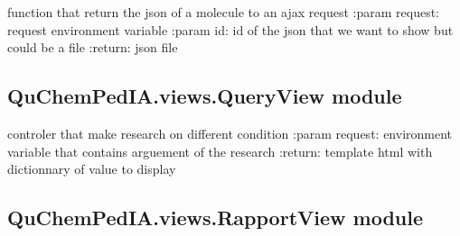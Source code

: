 \documentclass[letterpaper,10pt,english]{sphinxmanual}
\begin{document}
\begin{fulllineitems}
\label{\detokenize{QuChemPedIA.views:QuChemPedIA.views.DetailsView.details_json}}
function that return the json of a molecule to an ajax request
:param request: request environment variable
:param id: id of the json that we want to show but could be a file
:return: json file

\end{fulllineitems}



\subsection{QuChemPedIA.views.QueryView module}
\label{\detokenize{QuChemPedIA.views:module-QuChemPedIA.views.QueryView}}\label{\detokenize{QuChemPedIA.views:quchempedia-views-queryview-module}}

\begin{fulllineitems}
\label{\detokenize{QuChemPedIA.views:QuChemPedIA.views.QueryView.build_url}}
\end{fulllineitems}


\begin{fulllineitems}
\label{\detokenize{QuChemPedIA.views:QuChemPedIA.views.QueryView.query}}
controler that make research on different condition
:param request: environment variable that contains arguement of the research
:return: template html with dictionnary of value to display

\end{fulllineitems}



\subsection{QuChemPedIA.views.RapportView module}
\label{\detokenize{QuChemPedIA.views:module-QuChemPedIA.views.RapportView}}\label{\detokenize{QuChemPedIA.views:quchempedia-views-rapportview-module}}
\end{document}
